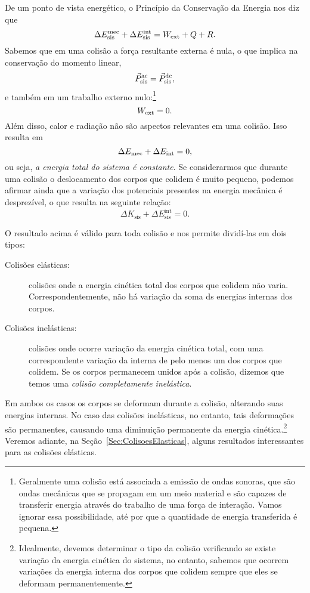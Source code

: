 De um ponto de vista energético, o Princípio da Conservação da Energia nos diz que
\begin{equation}
    \Delta E_{\text{sis}}^{\rm{mec}} + \Delta E_{\rm{sis}}^{\text{int}} = W_{\rm{ext}} + Q + R.
\end{equation}
%
Sabemos que em uma colisão a força resultante externa é nula, o que implica na conservação do momento linear,
\begin{equation}
    \vec{P}_{\rm{sis}}^{\rm{ac}} = \vec{P}_{\rm{sis}}^{\rm{dc}},
\end{equation}
%
e também em um trabalho externo nulo:\footnote{Geralmente uma colisão está associada a emissão de ondas sonoras, que são ondas mecânicas que se propagam em um meio material e são capazes de transferir energia através do trabalho de uma força de interação. Vamos ignorar essa possibilidade, até por que a quantidade de energia transferida é pequena.}
\begin{equation}
    W_{\rm{ext}} = 0.
\end{equation}
%
Além disso, calor e radiação não são aspectos relevantes em uma colisão. Isso resulta em
\begin{equation}\label{Eq:ConsEnergiaEmColisao}
    \Delta E_{\rm{mec}} + \Delta E_{\rm{int}} = 0,
\end{equation}
%
ou seja, \emph{a energia total do sistema é constante}. Se considerarmos que durante uma colisão o deslocamento dos corpos que colidem é muito pequeno, podemos afirmar ainda que a variação dos potenciais presentes na energia mecânica é desprezível, o que resulta na seguinte relação:
\begin{equation}
    \Delta K_{\text{sis}} + \Delta E_{\text{sis}}^{\text{int}} = 0.
\end{equation}

O resultado acima é válido para toda colisão e nos permite dividí-las em dois tipos:
\begin{description}
    \item[Colisões elásticas:] colisões onde a energia cinética total dos corpos que colidem não varia. Correspondentemente, não há variação da soma ds energias internas dos corpos.
    
    \item[Colisões inelásticas:] colisões onde ocorre variação da energia cinética total, com uma correspondente variação da interna de pelo menos um dos corpos que colidem. Se os corpos permanecem unidos após a colisão, dizemos que temos uma \emph{colisão completamente inelástica}.
\end{description}
%
Em ambos os casos os corpos se deformam durante a colisão, alterando suas energias internas. No caso das colisões inelásticas, no entanto, tais deformações são permanentes, causando uma diminuição permanente da energia cinética.\footnote[][-10cm]{Idealmente, devemos determinar o tipo da colisão verificando se existe variação da energia cinética do sistema, no entanto, sabemos que ocorrem variações da energia interna dos corpos que colidem sempre que eles se deformam permanentemente.} Veremos adiante, na Seção~\ref{Sec:ColisoesElasticas}, alguns resultados interessantes para as colisões elásticas.

